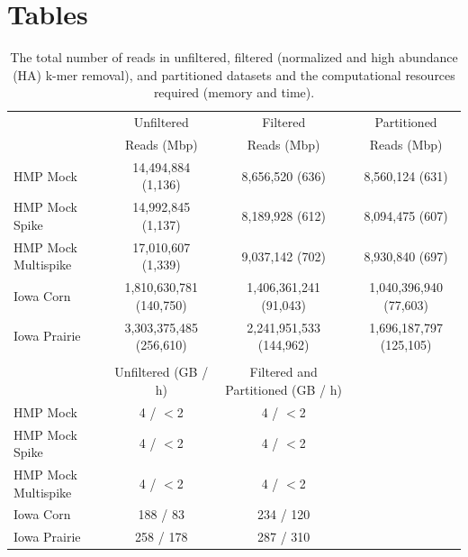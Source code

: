\documentclass[11pt]{article} %
\begin{document}


\pagebreak

\section{Tables}

\begin{table}[ht]
\small
\caption{The total number of reads  in unfiltered, filtered (normalized
  and high abundance (HA) k-mer removal), and partitioned datasets and
  the computational resources required (memory and time).}
\begin{tabular}{l c c c }

& Unfiltered & Filtered & Partitioned \\ 
& Reads (Mbp) & Reads (Mbp) & Reads (Mbp) \\
\hline
HMP Mock & 14,494,884 (1,136) & 8,656,520 (636) & 8,560,124 (631)  \\
HMP Mock Spike & 14,992,845 (1,137) & 8,189,928 (612) & 8,094,475 (607)  \\
HMP Mock Multispike & 17,010,607 (1,339) & 9,037,142  (702) & 8,930,840 (697)  \\
Iowa Corn & 1,810,630,781 (140,750)  & 1,406,361,241 (91,043) & 1,040,396,940 (77,603)  \\ 
Iowa Prairie & 3,303,375,485 (256,610) & 2,241,951,533 (144,962) & 1,696,187,797 (125,105)  \\ 
\\
 & Unfiltered (GB / h) & Filtered and Partitioned (GB / h) \\
HMP Mock &  4 / $<$2 & 4 / $<$2 \\
HMP Mock Spike & 4 / $<$2 & 4 /
$<$2 \\
HMP Mock Multispike &  4 / $<$2 &
4 / $<$2 \\
Iowa Corn & 188 / 83 &
234 / 120 \\ 
Iowa Prairie & 258 / 178 & 287 / 310 \\ \hline

\end{tabular}
\label{data-summary}
\end{table}
\end{document}
